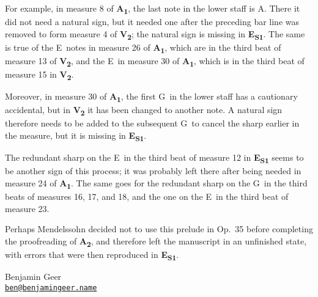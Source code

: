 \documentclass[a4paper, 12pt]{book}
\newcommand{\source}[2]{\textbf{#1\textsubscript{#2}}}
\begin{document}
{    For example, in measure 8 of \source{A}{1}, the last note in the
    lower staff is A\na. There it did not need a natural sign, but it
    needed one after the preceding bar line was removed to form
    measure 4 of \source{V}{2}; the natural sign is missing in
    \source{E}{S1}. The same is true of the E\na\ notes in measure 26 of
    \source{A}{1}, which are in the third beat of measure 13 of
    \source{V}{2}, and the E\na\ in measure 30 of \source{A}{1},
    which is in the third beat of measure 15 in
    \source{V}{2}.

    Moreover, in measure 30 of \source{A}{1}, the first G\na\ in the
    lower staff has a cautionary accidental, but in \source{V}{2} it
    has been changed to another note. A natural sign therefore needs
    to be added to the subsequent G\na\ to cancel the sharp earlier in
    the measure, but it is missing in \source{E}{S1}.

    The redundant sharp on the E\sh\ in the third beat of measure 12
    in \source{E}{S1} seems to be another sign of this process; it was
    probably left there after being needed in measure 24 of
    \source{A}{1}. The same goes for the redundant sharp on the
    G\sh\ in the third beats of measures 16, 17, and 18, and the one
    on the E\sh\ in the third beat of measure 23.

    Perhaps Mendelssohn decided not to use this prelude in Op.\ 35
    before completing the proofreading of \source{A}{2}, and therefore
    left the manuscript in an unfinished state, with errors that were
    then reproduced in \source{E}{S1}.
  }
  {}

\raggedbottom

\vspace{\baselineskip}

\hfill
\begin{minipage}[t]{0.55\textwidth}
  Benjamin Geer \\
  \href{mailto:ben@benjamingeer.name}{\smaller \texttt{ben@benjamingeer.name}}
\end{minipage}

\pagebreak
\cleardoublepage
\mainmatter

\ifdef{\performance}
  {\ifdef{\variant}
    {}
    {}}
  {}
\end{document}
